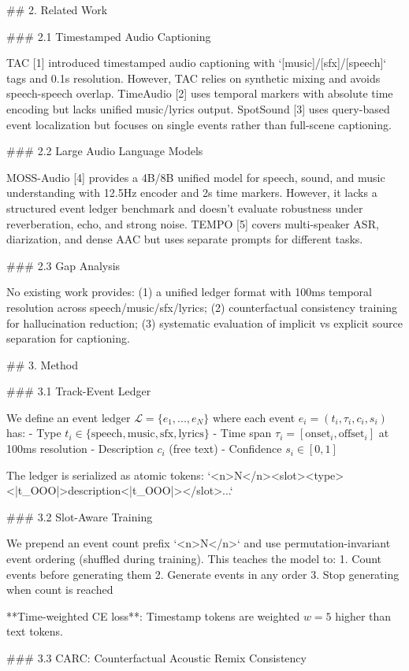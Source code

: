 ## 2. Related Work

### 2.1 Timestamped Audio Captioning

TAC [1] introduced timestamped audio captioning with `[music]/[sfx]/[speech]` tags and 0.1s resolution. However, TAC relies on synthetic mixing and avoids speech-speech overlap. TimeAudio [2] uses temporal markers with absolute time encoding but lacks unified music/lyrics output. SpotSound [3] uses query-based event localization but focuses on single events rather than full-scene captioning.

### 2.2 Large Audio Language Models

MOSS-Audio [4] provides a 4B/8B unified model for speech, sound, and music understanding with 12.5Hz encoder and 2s time markers. However, it lacks a structured event ledger benchmark and doesn't evaluate robustness under reverberation, echo, and strong noise. TEMPO [5] covers multi-speaker ASR, diarization, and dense AAC but uses separate prompts for different tasks.

### 2.3 Gap Analysis

No existing work provides: (1) a unified ledger format with 100ms temporal resolution across speech/music/sfx/lyrics; (2) counterfactual consistency training for hallucination reduction; (3) systematic evaluation of implicit vs explicit source separation for captioning.

## 3. Method

### 3.1 Track-Event Ledger

We define an event ledger $\mathcal{L} = \{e_1, ..., e_N\}$ where each event $e_i = (t_i, \tau_i, c_i, s_i)$ has:
- Type $t_i \in \{\text{speech}, \text{music}, \text{sfx}, \text{lyrics}\}$
- Time span $\tau_i = [\text{onset}_i, \text{offset}_i]$ at 100ms resolution
- Description $c_i$ (free text)
- Confidence $s_i \in [0, 1]$

The ledger is serialized as atomic tokens: `<n>N</n><slot><type><|t_OOO|>description<|t_OOO|></slot>...`

### 3.2 Slot-Aware Training

We prepend an event count prefix `<n>N</n>` and use permutation-invariant event ordering (shuffled during training). This teaches the model to:
1. Count events before generating them
2. Generate events in any order
3. Stop generating when count is reached

**Time-weighted CE loss**: Timestamp tokens are weighted $w=5$ higher than text tokens.

### 3.3 CARC: Counterfactual Acoustic Remix Consistency

